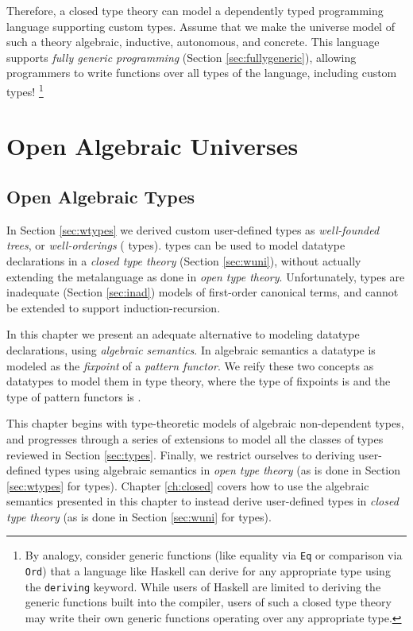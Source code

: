 \documentclass[12pt]{report}
\newcommand{\refch}[1]{Chapter \ref{ch:#1}}
\newcommand{\refsec}[1]{Section \ref{sec:#1}}
\newcommand{\AgdaData}[1]{\AgdaDatatype{#1}}
\theoremstyle{definition}
\theoremstyle{remark}
\numberwithin{definition}{section}
\numberwithin{equation}{section}
\numberwithin{proposition}{section}
\numberwithin{conjecture}{section}
\numberwithin{theorem}{section}
\numberwithin{lemma}{section}
\numberwithin{corollary}{section}
\numberwithin{example}{section}
\numberwithin{remark}{section}
\begin{document}
Therefore, a closed type theory can model a dependently typed
programming language supporting custom types. Assume that we make
the universe model of such a theory algebraic, inductive, autonomous,
and concrete. This language supports
\textit{fully generic programming} (\refsec{fullygeneric}), allowing
programmers to write functions over all types of the
language, including custom types!
\footnote{By analogy, consider generic functions
  (like equality via \texttt{Eq} or comparison via \texttt{Ord})
  that a language like
  Haskell can derive for any appropriate type using the
  \texttt{deriving} keyword. While users of Haskell are limited to
  deriving the generic functions built into the compiler, users of
  such a closed type theory may write their own generic functions
  operating over any appropriate type.
}



\part{Open Algebraic Universes}\label{part:open}

\chapter{Open Algebraic Types}\label{ch:open}

In \refsec{wtypes} we derived custom user-defined types as
\textit{well-founded trees}, or
\textit{well-orderings} (\AgdaData{W} types). \AgdaData{W} types
can be used to model
datatype declarations
in a \textit{closed type theory} (\refsec{wuni}),
without actually extending the metalanguage as done in
\textit{open type theory}. Unfortunately, \AgdaData{W} types are
inadequate (\refsec{inad}) models of first-order canonical terms, and
cannot be extended to support induction-recursion.

In this chapter we present an adequate alternative to modeling
datatype declarations, using \textit{algebraic semantics}. In
algebraic semantics a datatype is modeled as the \textit{fixpoint}
of a \textit{pattern functor}. We reify these two concepts as
datatypes to model them in type theory, where the type of fixpoints is
\AgdaData{μ} and the type of pattern functors is \AgdaData{Desc}.

This chapter begins with type-theoretic models of algebraic
non-dependent types, and progresses through a series of
extensions to model all the classes of types reviewed in
\refsec{types}. Finally, we restrict ourselves to deriving
user-defined types using algebraic semantics in
\textit{open type theory} (as is done in \refsec{wtypes} for
\AgdaData{W} types).
\refch{closed} covers how to use the
algebraic semantics presented in this chapter to instead derive
user-defined types in \textit{closed type theory} (as is done
in \refsec{wuni} for \AgdaData{W} types).
\end{document}
